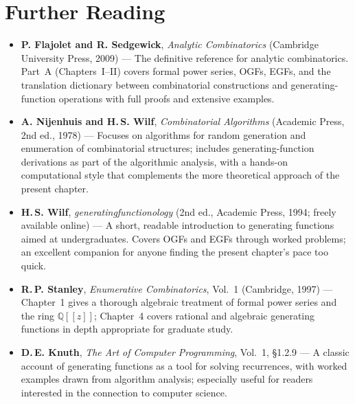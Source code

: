 \section*{Further Reading}

\begin{itemize}
  \item \textbf{P. Flajolet and R. Sedgewick}, \emph{Analytic Combinatorics} (Cambridge University Press, 2009) \cite{FlajoletSedgewick2009} --- The definitive reference for analytic combinatorics. Part~A (Chapters~I--II) covers formal power series, OGFs, EGFs, and the translation dictionary between combinatorial constructions and generating-function operations with full proofs and extensive examples.

  \item \textbf{A. Nijenhuis and H.\,S. Wilf}, \emph{Combinatorial Algorithms} (Academic Press, 2nd ed., 1978) \cite{NijenhuisWilf1978} --- Focuses on algorithms for random generation and enumeration of combinatorial structures; includes generating-function derivations as part of the algorithmic analysis, with a hands-on computational style that complements the more theoretical approach of the present chapter.

  \item \textbf{H.\,S. Wilf}, \emph{generatingfunctionology} (2nd ed., Academic Press, 1994; freely available online) --- A short, readable introduction to generating functions aimed at undergraduates. Covers OGFs and EGFs through worked problems; an excellent companion for anyone finding the present chapter's pace too quick.

  \item \textbf{R.\,P. Stanley}, \emph{Enumerative Combinatorics}, Vol.~1 (Cambridge, 1997) --- Chapter~1 gives a thorough algebraic treatment of formal power series and the ring $\mathbb{Q}[[z]]$; Chapter~4 covers rational and algebraic generating functions in depth appropriate for graduate study.

  \item \textbf{D.\,E. Knuth}, \emph{The Art of Computer Programming}, Vol.~1, \S1.2.9 --- A classic account of generating functions as a tool for solving recurrences, with worked examples drawn from algorithm analysis; especially useful for readers interested in the connection to computer science.
\end{itemize}
